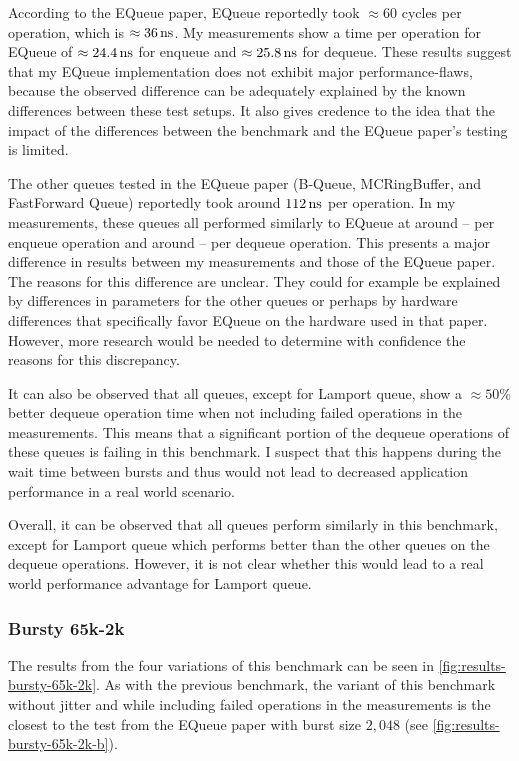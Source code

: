 According to the EQueue paper, EQueue reportedly took $\approx 60$ cycles per operation, which is
$\approx \SI{36}{\nano\second}$.
My measurements show a time per operation for EQueue of $\approx \SI{24.4}{\nano\second}$ for enqueue and
$\approx \SI{25.8}{\nano\second}$ for dequeue.
These results suggest that my EQueue implementation does not exhibit major performance-flaws, because the
observed difference can be adequately explained by the known differences between these test setups.
It also gives credence to the idea that the impact of the differences between the benchmark and the EQueue
paper's testing is limited.

The other queues tested in the EQueue paper (B-Queue, MCRingBuffer, and FastForward Queue) reportedly took
around $\SI{112}{\nano\second}$ per operation.
In my measurements, these queues all performed similarly to EQueue at around -- per enqueue operation
and around -- per dequeue operation.
This presents a major difference in results between my measurements and those of the EQueue paper.
The reasons for this difference are unclear.
They could for example be explained by differences in parameters for the other queues or perhaps by hardware
differences that specifically favor EQueue on the hardware used in that paper.
However, more research would be needed to determine with confidence the reasons for this discrepancy.

It can also be observed that all queues, except for Lamport queue, show a $\approx 50\%$ better dequeue
operation time when not including failed operations in the measurements.
This means that a significant portion of the dequeue operations of these queues is failing in this benchmark.
I suspect that this happens during the wait time between bursts and thus would not lead to decreased
application performance in a real world scenario.

Overall, it can be observed that all queues perform similarly in this benchmark, except for Lamport queue
which performs better than the other queues on the dequeue operations.
However, it is not clear whether this would lead to a real world performance advantage for Lamport queue.

\subsubsection{Bursty 65k-2k}
The results from the four variations of this benchmark can be seen in \autoref{fig:results-bursty-65k-2k}.
As with the previous benchmark, the variant of this benchmark without jitter and while including failed
operations in the measurements is the closest to the test from the EQueue paper with burst size $2,048$ (see
\autoref{fig:results-bursty-65k-2k-b}).

